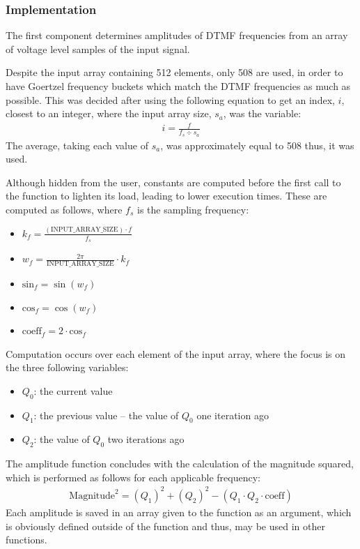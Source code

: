 \documentclass{cce2014-design}
\begin{document}
{	\subsubsection{Implementation}

		The first component determines amplitudes of DTMF frequencies from an array of voltage level samples of the input signal.

		Despite the input array containing 512 elements, only 508 are used, in order to have Goertzel frequency buckets which match the DTMF frequencies as much as possible.
		This was decided after using the following equation to get an index, $i$, closest to an integer, where the input array size, $s_a$, was the variable:
		\begin{align*}
			i = \frac{f}{f_s \div s_a}
		\end{align*}
		The average, taking each value of $s_a$, was approximately equal to 508 thus, it was used.

		Although hidden from the user, constants are computed before the first call to the function to lighten its load, leading to lower execution times.
		These are computed as follows, where $f_s$ is the sampling frequency:
		\begin{itemize}
			\item{$k_f = \frac{(\text{INPUT\_ARRAY\_SIZE}) \cdot f}{f_s}$}
			\item{$w_f = \frac{2 \pi}{\text{INPUT\_ARRAY\_SIZE}} \cdot k_f$}
			\item{$\text{sin}_f = \sin{(w_f)}$}
			\item{$\text{cos}_f = \cos{(w_f)}$}
			\item{$\text{coeff}_f = 2 \cdot \text{cos}_f$}
		\end{itemize}

		Computation occurs over each element of the input array, where the focus is on the three following variables:
		\begin{itemize}
			\item{$Q_0$: the current value}
			\item{$Q_1$: the previous value -- the value of $Q_0$ one iteration ago}
			\item{$Q_2$: the value of $Q_0$ two iterations ago}
		\end{itemize}

		The amplitude function concludes with the calculation of the magnitude squared, which is performed as follows for each applicable frequency:
		\begin{align*}
			\text{Magnitude}^2 = (Q_1)^2 + (Q_2)^2 - (Q_1 \cdot Q_2 \cdot \text{coeff})
		\end{align*}
		Each amplitude is saved in an array given to the function as an argument, which is obviously defined outside of the function and thus, may be used in other functions.

}
\end{document}
